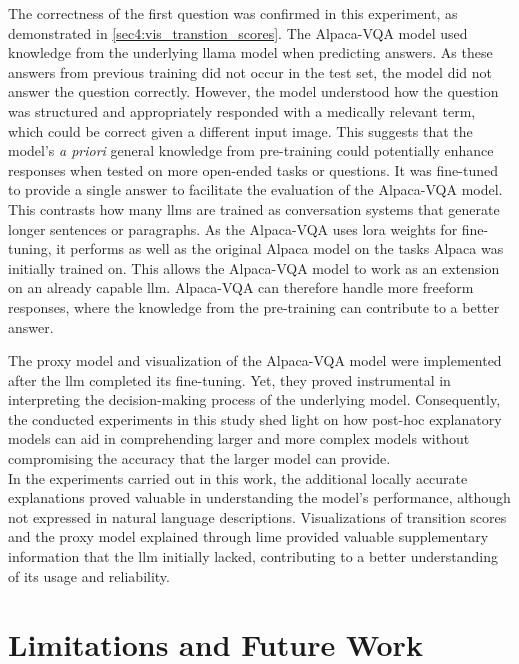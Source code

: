 The correctness of the first question was confirmed in this experiment, as demonstrated in \autoref{sec4:vis_transtion_scores}. The Alpaca-VQA model used knowledge from the underlying \gls{llama} model when predicting answers. As these answers from previous training did not occur in the test set, the model did not answer the question correctly. However, the model understood how the question was structured and appropriately responded with a medically relevant term, which could be correct given a different input image.
This suggests that the model's \textit{a priori} general knowledge from pre-training could potentially enhance responses when tested on more open-ended tasks or questions. It was fine-tuned to provide a single answer to facilitate the evaluation of the Alpaca-VQA model. This contrasts how many \glspl{llm} are trained as conversation systems that generate longer sentences or paragraphs. As the Alpaca-VQA uses \gls{lora} weights for fine-tuning, it performs as well as the original Alpaca model on the tasks Alpaca was initially trained on. This allows the Alpaca-VQA model to work as an extension on an already capable \gls{llm}. Alpaca-VQA can therefore handle more freeform responses, where the knowledge from the pre-training can contribute to a better answer.

The proxy model and visualization of the Alpaca-VQA model were implemented after the \gls{llm} completed its fine-tuning. Yet, they proved instrumental in interpreting the decision-making process of the underlying model. 
Consequently, the conducted experiments in this study shed light on how post-hoc explanatory models can aid in comprehending larger and more complex models without compromising the accuracy that the larger model can provide.\\


In the experiments carried out in this work, the additional locally accurate explanations proved valuable in understanding the model's performance, although not expressed in natural language descriptions. Visualizations of transition scores and the proxy model explained through \gls{lime} provided valuable supplementary information that the \gls{llm} initially lacked, contributing to a better understanding of its usage and reliability.



\section{Limitations and Future Work}
\label{sec:5_3_future_work}  %

